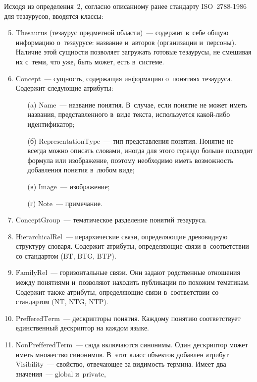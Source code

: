 \begin{multicols}{2}
Исходя из определения~2, согласно описанному ранее стандарту  
ISO~2788-1986 для тезаурусов, вводятся классы:
\begin{enumerate}[1.]
\setcounter{enumi}{4}
\item $\mathrm{Thesaurus}$ (тезаурус предметной области)~--- содержит в~себе общую 
информацию о~тезаурусе: название и~авторов (организации и~персоны). 
Наличие этой сущности позволяет загружать готовые тезаурусы, не 
смешивая их с~теми, что уже, быть может, есть в~сис\-теме.
\item $\mathrm{Concept}$~--- сущность, содержащая информацию о~понятиях 
тезауруса. Содержит следующие атрибуты:
\begin{itemize}
\item[(a)] $\mathrm{Name}$~--- название понятия. В~случае, если понятие 
не может иметь названия, пред\-став\-лен\-но\-го в~виде текста, 
используется ка\-кой-ли\-бо идентификатор;
\item[(б)] $\mathrm{RepresentationType}$~--- тип представления понятия. 
Понятие не всегда можно описать словами, иногда для этого 
гораздо больше подходит формула или изображение, поэтому 
необходимо иметь возможность добавления понятия в~любом виде;
\item[(в)] $\mathrm{Image}$~--- изображение;
\item[(г)] $\mathrm{Note}$~--- примечание.
\end{itemize}
\item $\mathrm{ConceptGroup}$~--- тематическое разделение понятий тезауруса. 
\item $\mathrm{HierarchicalRel}$~--- иерархические связи, определяющие 
древовидную структуру словаря. Содержит атрибуты, определяющие 
связи в~соответствии со стандартом ($\mathrm{BT}$, $\mathrm{BTG}$, $\mathrm{BTP}$).
\item $\mathrm{FamilyRel}$~--- горизонтальные связи. Они задают родственные 
отношения между понятиями и~позволяют находить публикации по 
похожим тематикам. Содержит также атрибуты, определяющие связи 
в~соответствии со стандартом ($\mathrm{NT}$, $\mathrm{NTG}$, $\mathrm{NTP}$).
\item $\mathrm{PrefferedTerm}$~--- дескрипторы понятия. Каж\-до\-му понятию 
соответствует единственный дескриптор на каждом языке. 
\item $\mathrm{NonPrefferedTerm}$~--- сюда включаются синонимы. Один 
дескриптор может иметь множество синонимов. В~этот класс объектов 
добавлен атрибут $\mathrm{Visibility}$~--- свойство, от\-ве\-ча\-ющее за видимость 
термина. Имеет два значения~--- $\mathrm{global}$ и~$\mathrm{private}$, 

\end{enumerate}
\end{multicols}
